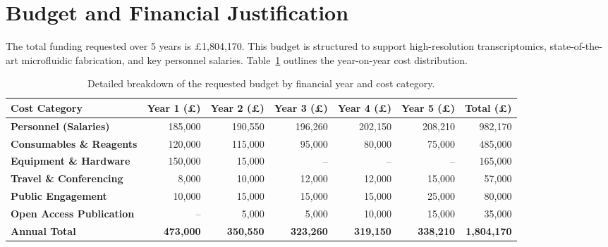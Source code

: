 \section{Budget and Financial Justification}

The total funding requested over 5 years is \pounds 1,804,170. This budget is structured to support high-resolution transcriptomics, state-of-the-art microfluidic fabrication, and key personnel salaries. Table~\ref{tab:budget} outlines the year-on-year cost distribution.

\begin{table}[htbp]
\centering
\sffamily\small
\renewcommand{\arraystretch}{1.2}
\begin{tabularx}{\textwidth}{X r r r r r r}
\toprule
\rowcolor{secondarycolor}
\textbf{\color{white}Cost Category} & 
\textbf{\color{white}Year 1 (\pounds)} & 
\textbf{\color{white}Year 2 (\pounds)} & 
\textbf{\color{white}Year 3 (\pounds)} & 
\textbf{\color{white}Year 4 (\pounds)} & 
\textbf{\color{white}Year 5 (\pounds)} & 
\textbf{\color{white}Total (\pounds)} \\
\midrule
\textbf{Personnel (Salaries)} & 185,000 & 190,550 & 196,260 & 202,150 & 208,210 & 982,170 \\
\rowcolor{bgcolor}
\textbf{Consumables \& Reagents} & 120,000 & 115,000 & 95,000 & 80,000 & 75,000 & 485,000 \\
\textbf{Equipment \& Hardware} & 150,000 & 15,000 & -- & -- & -- & 165,000 \\
\rowcolor{bgcolor}
\textbf{Travel \& Conferencing} & 8,000 & 10,000 & 12,000 & 12,000 & 15,000 & 57,000 \\
\textbf{Public Engagement} & 10,000 & 15,000 & 15,000 & 15,000 & 25,000 & 80,000 \\
\rowcolor{bgcolor}
\textbf{Open Access Publication} & -- & 5,000 & 5,000 & 10,000 & 15,000 & 35,000 \\
\midrule
\textbf{Annual Total} & \textbf{473,000} & \textbf{350,550} & \textbf{323,260} & \textbf{319,150} & \textbf{338,210} & \textbf{1,804,170} \\
\bottomrule
\end{tabularx}
\caption{Detailed breakdown of the requested budget by financial year and cost category.}
\label{tab:budget}
\end{table}

